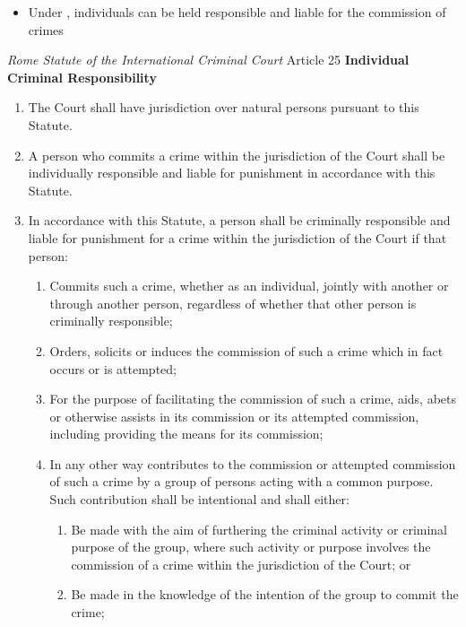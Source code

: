 \begin{itemize}
    \item Under , individuals can be held responsible and liable for the commission of crimes
\end{itemize}

\begin{statutedetails}{\textit{Rome Statute of the International Criminal Court} Article 25}
    \flushleft
    \textbf{Individual Criminal Responsibility}
    \begin{enumerate}
        \item The Court shall have jurisdiction over natural persons pursuant to this Statute.
        \item A person who commits a crime within the jurisdiction of the Court shall be individually responsible and liable for punishment in accordance with this Statute.
        \item In accordance with this Statute, a person shall be criminally responsible and liable for punishment for a crime within the jurisdiction of the Court if that person:
        \begin{enumerate}[label=(\alph*)]
            \item Commits such a crime, whether as an individual, jointly with another or through another person, regardless of whether that other person is criminally responsible; 
            \item Orders, solicits or induces the commission of such a crime which in fact occurs or is attempted;
            \item For the purpose of facilitating the commission of such a crime, aids, abets or otherwise assists in its commission or its attempted commission, including providing the means for its commission; 
            \item In any other way contributes to the commission or attempted commission of such a crime by a group of persons acting with a common purpose. Such contribution shall be intentional and shall either:
            \begin{enumerate}[label=(\roman*)]
                \item Be made with the aim of furthering the criminal activity or criminal purpose of the group, where such activity or purpose involves the commission of a crime within the jurisdiction of the Court; or 
                \item Be made in the knowledge of the intention of the group to commit the crime;

\end{enumerate}
\end{enumerate}
\end{enumerate}
\end{statutedetails}
